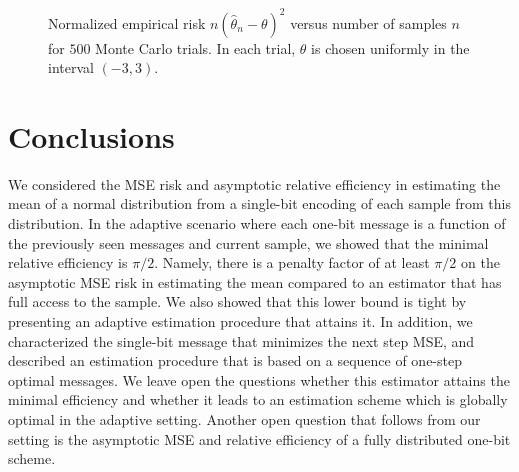 \documentclass[letterpaper, conference]{IEEEtran}      %
\begin{document}
\begin{figure}
\begin{center}
\caption{Normalized empirical risk $n\left(\widehat{\theta}_n-\theta\right)^2$ versus number of samples $n$ for $500$ Monte Carlo trials. In each trial, $\theta$ is chosen uniformly in the interval $(-3,3)$. \label{fig:adaptive_error}  }
\end{center}
\end{figure}


\section{Conclusions \label{sec:conclusions}}
We considered the MSE risk and asymptotic relative efficiency in estimating the mean of a normal distribution from a single-bit encoding of each sample from this distribution. In the adaptive scenario where each one-bit message is a function of the previously seen messages and current sample, we showed that the minimal relative efficiency is $\pi/2$. Namely, there is a penalty factor of at least $\pi/2$ on the asymptotic MSE risk in estimating the mean compared to an estimator that has full access to the sample. We also showed that this lower bound is tight by presenting an adaptive estimation procedure that attains it.
In addition, we characterized the single-bit message that minimizes the next step MSE, and described an estimation procedure that is based on a sequence of one-step optimal messages. We leave open the questions whether this estimator attains the minimal efficiency and whether it leads to an estimation scheme which is globally optimal in the adaptive setting. Another open question that follows from our setting is the asymptotic MSE and relative efficiency of a fully distributed one-bit scheme.
\end{document}

